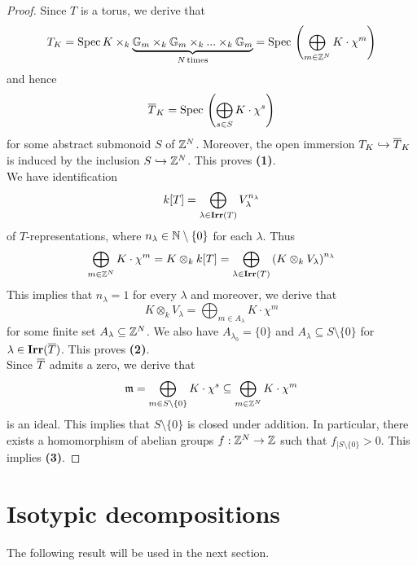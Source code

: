 \begin{proof}
Since $T$ is a torus, we derive that
$$T_K = \mathrm{Spec}\, K \times_k \underbrace{\mathbb{G}_{m}\times_k \mathbb{G}_{m}\times_k ...\times_k \mathbb{G}_{m}}_{N\,\mathrm{times}} = \mathrm{Spec}\, \left(\bigoplus_{m\in {\mathbb Z}^N}K\cdot \chi^m\right)$$
and hence
$$\overline{T}_K = \mathrm{Spec}\, \left(\bigoplus_{s\in S}K\cdot \chi^s\right)$$
for some abstract submonoid $S$ of ${\mathbb Z}^N$. Moreover, the open immersion $T_K\hookrightarrow \overline{T}_K$ is induced by the inclusion $S \hookrightarrow {\mathbb Z}^N$. This proves \textbf{(1)}.\\
We have identification
$$k[T] = \bigoplus_{\lambda\in \mathbf{Irr}(T)}V_{\lambda}^{n_{\lambda}}$$
of $T$-representations, where $n_{\lambda}\in {\mathbb N}\setminus \{0\}$ for each $\lambda$. Thus
$$\bigoplus_{m\in {\mathbb Z}^N}K\cdot \chi^m = K\otimes_kk[T] = \bigoplus_{\lambda\in \mathbf{Irr}(T)}\left(K\otimes_kV_{\lambda}\right)^{n_{\lambda}}$$
This implies that $n_{\lambda} = 1$ for every $\lambda$ and moreover, we derive that
$$K\otimes_kV_{\lambda} = \bigoplus_{m\in A_{\lambda}}K\cdot \chi^m$$
for some finite set $A_{\lambda}\subseteq {\mathbb Z}^N$. We also have $A_{\lambda_0} = \{0\}$ and $A_{\lambda}\subseteq S\setminus \{0\}$ for $\lambda \in \mathbf{Irr}(\overline{T})$. This proves \textbf{(2)}.\\
Since $\overline{T}$ admits a zero, we derive that
$$\mathfrak{m} = \bigoplus_{m \in S\setminus\{0\}}K\cdot \chi^s \subseteq \bigoplus_{m\in {\mathbb Z}^N}K\cdot \chi^m$$
is an ideal. This implies that $S\setminus \{0\}$ is closed under addition. In particular, there exists a homomorphism of abelian groups $f:{\mathbb Z}^N\rightarrow {\mathbb Z}$ such that $f_{\mid S\setminus \{0\}}>0$. This implies \textbf{(3)}.
\end{proof}

\section{Isotypic decompositions}
\noindent
The following result will be used in the next section.

